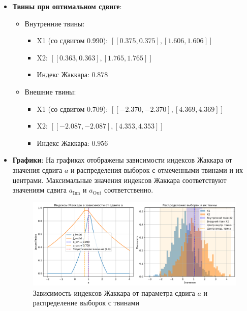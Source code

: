 \documentclass[a4paper]{article}
\begin{document}
\begin{itemize}
        \item \textbf{Твины при оптимальном сдвиге}:
        \begin{itemize}
            \item Внутренние твины:
            \begin{itemize}
                \item X1 (со сдвигом 0.990): \([[0.375, 0.375], [1.606, 1.606]]\)
                \item X2: \([[0.363, 0.363], [1.765, 1.765]]\)
                \item Индекс Жаккара: \(0.878\)
            \end{itemize}
            \item Внешние твины:
            \begin{itemize}
                \item X1 (со сдвигом 0.709): \([[-2.370, -2.370], [4.369, 4.369]]\)
                \item X2: \([[-2.087, -2.087], [4.353, 4.353]]\)
                \item Индекс Жаккара: \(0.956\)
            \end{itemize}
        \end{itemize}

        \item \textbf{Графики}: На графиках отображены зависимости индексов Жаккара от значения сдвига \( a \) и распределения 
        выборок с отмеченными твинами и их центрами. Максимальные значения индексов Жаккара соответствуют значениям сдвига 
        \( a_{\text{Inn}} \) и \( a_{\text{Out}} \) соответственно.
        \begin{figure}[H]
            \centering
            \includegraphics[width=1\textwidth]{plot}
            \caption{Зависимость индексов Жаккара от параметра сдвига \(a\) и распределение выборок с твинами}
        \end{figure}
    \end{itemize}
\end{document}
